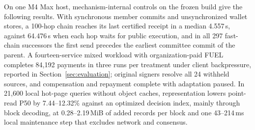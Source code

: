 On one M4 Max host, mechanism-internal controls on the frozen build give the following results. With synchronous member commits and unsynchronized wallet stores, a 100-hop chain reaches its last certified receipt in a median 4.557\,s, against 64.476\,s when each hop waits for public execution, and in all 297 fast-chain successors the first send precedes the earliest committee commit of the parent. A fourteen-service mixed workload with organization-paid FUEL completes 84,192 payments in three runs per treatment under client backpressure, reported in Section~\ref{sec:evaluation}; original signers resolve all 24 withheld sources, and compensation and repayment complete with adaptation paused. In 21,600 local hot-page queries without object caches, representation lowers point-read P50 by 7.44--12.32\% against an optimized decision index, mainly through block decoding, at 0.28--2.19\,MiB of added records per block and one 43--214\,ms local maintenance step that excludes network and consensus.